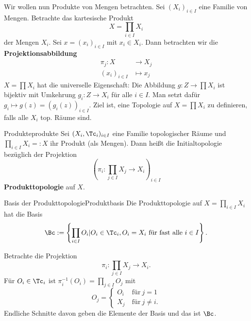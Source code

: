 Wir wollen nun Produkte von Mengen betrachten. Sei $(X_i)_{i \in I}$ eine Familie von Mengen. Betrachte das kartesische Produkt
\begin{equation}
X = \prod_{i \in I} X_i
\end{equation}
der Mengen $X_i$. Sei $x = (x_i)_{i \in I}$ mit $x_i \in X_i$. Dann betrachten wir die \textbf{Projektionsabbildung}
\begin{equation}
\begin{split}
\pi_j: X &\to X_j\\
(x_i)_{i \in I} &\mapsto x_j
\end{split}
\end{equation}
$X = \prod X_i$ hat die universelle Eigenschaft:
Die Abbildung $g: Z \to \prod X_i$ ist bijektiv mit Umkehrung $g_i: Z \to X_i$ für alle $i \in I$. Man setzt dafür $g_i \mapsto g(z) = (g_i(z))_{i \in I}$. Ziel ist, eine Topologie auf $X = \prod X_i$ zu definieren, falls alle $X_i$ top. Räume sind.
\begin{definition}{Produkte}{produkte}
Sei $(X_i, \Tc_i)_{i \in I}$ eine Familie topologischer Räume und $\prod_{i \in I} X_i =: X$ ihr Produkt (als Mengen). Dann heißt die Initialtopologie bezüglich der Projektion
\begin{equation}
\left( \pi_i: \prod_{j \in I} X_j \to X_i \right)_{i \in I}
\end{equation}
\textbf{Produkttopologie} auf $X$.
\end{definition}
\begin{satz}{Basis der Produkttopologie}{Produktbasis}
Die Produkttopologie auf $X = \prod_{i \in I} X_i$ hat die Basis 
\begin{equation}
\Bc := \left\{\prod_{i \in I} O_i | O_i \in \Tc_i, O_i = X_i \ \text{für fast alle} \ i \in I \right\}.
\end{equation}
\end{satz}
\begin{beweis}
Betrachte die Projektion
\begin{equation}
\pi_i: \prod_{j \in I} X_j \to X_i.
\end{equation}
Für $O_i \in \Tc_i$ ist $\pi^{-1}_i (O_i) = \prod_{j \in I} O_j$ mit 
\begin{equation}
O_j = \begin{cases} O_i \ &\text{für} \ j = 1\\ X_j \ &\text{für} \ j \neq i.\end{cases}
\end{equation}
Endliche Schnitte davon geben die Elemente der Basis und das ist $\Bc$.
\end{beweis}
